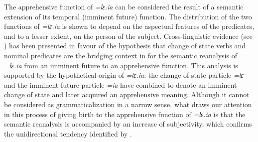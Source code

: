 \documentclass[output=paper,colorlinks,citecolor=brown, language=chinese]{langscibook}
\begin{document}
The apprehensive function of \textit{=lɛ.ia} can be considered the result of a semantic extension of its temporal (imminent future) function. The distribution of the two functions of \textit{=lɛ.ia} is shown to depend on the aspectual features of the predicates, and to a lesser extent, on the person of the subject. Cross-linguistic evidence (see \cite{HeineKuteva2002}) has been presented in favour of the hypothesis that change of state verbs and nominal predicates are the bridging context in  for the semantic reanalysis of \textit{=lɛ.ia} from an imminent future to an apprehensive function. This analysis is supported by the hypothetical origin of \textit{=lɛ.ia}: the change of state particle \textit{=lɛ} and the imminent future particle \textit{=ia} have combined to denote an imminent change of state and later acquired an apprehensive meaning. Although it cannot be considered as grammaticalization in a narrow sense, what draws our attention in this process of giving birth to the apprehensive function of \textit{=lɛ.ia} is that the semantic reanalysis is accompanied by an increase of subjectivity, which confirms the unidirectional tendency identified by \citet{Traugott1989}.
\end{document}

